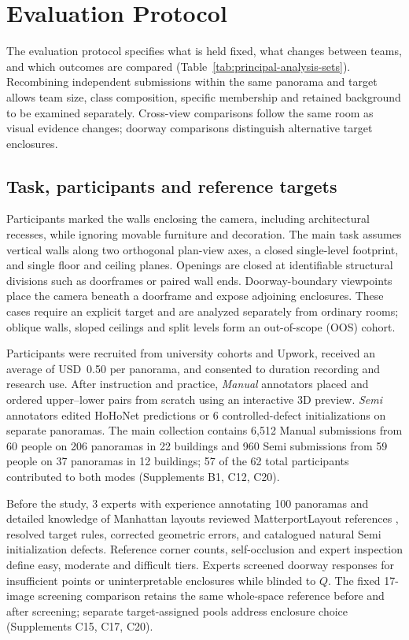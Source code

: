 \section{Evaluation Protocol}
\label{sec:study-design}

The evaluation protocol specifies what is held fixed, what changes between teams, and which outcomes are compared (Table~\ref{tab:principal-analysis-sets}). Recombining independent submissions within the same panorama and target allows team size, class composition, specific membership and retained background to be examined separately. Cross-view comparisons follow the same room as visual evidence changes; doorway comparisons distinguish alternative target enclosures.

\subsection{Task, participants and reference targets}

Participants marked the walls enclosing the camera, including architectural recesses, while ignoring movable furniture and decoration. The main task assumes vertical walls along two orthogonal plan-view axes, a closed single-level footprint, and single floor and ceiling planes. Openings are closed at identifiable structural divisions such as doorframes or paired wall ends. Doorway-boundary viewpoints place the camera beneath a doorframe and expose adjoining enclosures. These cases require an explicit target and are analyzed separately from ordinary rooms; oblique walls, sloped ceilings and split levels form an out-of-scope (OOS) cohort.

Participants were recruited from university cohorts and Upwork, received an average of USD~0.50 per panorama, and consented to duration recording and research use. After instruction and practice, \textit{Manual} annotators placed and ordered upper--lower pairs from scratch using an interactive 3D preview. \textit{Semi} annotators edited HoHoNet predictions \cite{hohonet2021} or 6 controlled-defect initializations on separate panoramas. The main collection contains 6,512 Manual submissions from 60 people on 206 panoramas in 22 buildings and 960 Semi submissions from 59 people on 37 panoramas in 12 buildings; 57 of the 62 total participants contributed to both modes (Supplements B1, C12, C20).

Before the study, 3 experts with experience annotating 100 panoramas and detailed knowledge of Manhattan layouts reviewed MatterportLayout references \cite{chang2017matterport3d,zou2021manhattan}, resolved target rules, corrected geometric errors, and catalogued natural Semi initialization defects. Reference corner counts, self-occlusion and expert inspection define easy, moderate and difficult tiers. Experts screened doorway responses for insufficient points or uninterpretable enclosures while blinded to $Q$. The fixed 17-image screening comparison retains the same whole-space reference before and after screening; separate target-assigned pools address enclosure choice (Supplements C15, C17, C20).

